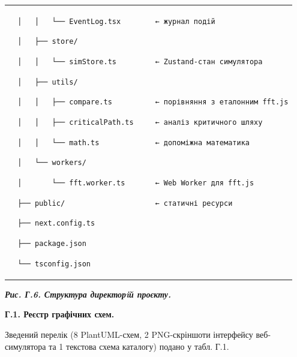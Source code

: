 \documentclass[
]{article}
\newcommand{\passthrough}[1]{#1}
\begin{document}
{\begin{longtable}[]{@{}
  >{\raggedright\arraybackslash}p{}@{}}
\passthrough{\lstinline!  │   │   └── !}\passthrough{\lstinline!EventLog.tsx!}\passthrough{\lstinline!        ← !}\passthrough{\lstinline!журнал!}\passthrough{\lstinline! подій!}

\passthrough{\lstinline!  │   ├── store/!}

\passthrough{\lstinline!  │   │   └── !}\passthrough{\lstinline!simStore.ts!}\passthrough{\lstinline!         ← !}\passthrough{\lstinline!Zustand-стан!}\passthrough{\lstinline! !}\passthrough{\lstinline!симулятора!}

\passthrough{\lstinline!  │   ├── utils/!}

\passthrough{\lstinline!  │   │   ├── !}\passthrough{\lstinline!compare.ts!}\passthrough{\lstinline!          ← !}\passthrough{\lstinline!порівняння!}\passthrough{\lstinline! з !}\passthrough{\lstinline!еталонним!}\passthrough{\lstinline! fft.js!}

\passthrough{\lstinline!  │   │   ├── !}\passthrough{\lstinline!criticalPath.ts!}\passthrough{\lstinline!     ← аналіз !}\passthrough{\lstinline!критичного!}\passthrough{\lstinline! !}\passthrough{\lstinline!шляху!}

\passthrough{\lstinline!  │   │   └── !}\passthrough{\lstinline!math.ts!}\passthrough{\lstinline!             ← !}\passthrough{\lstinline!допоміжна!}\passthrough{\lstinline! !}\passthrough{\lstinline!математика!}

\passthrough{\lstinline!  │   └── workers/!}

\passthrough{\lstinline!  │       └── !}\passthrough{\lstinline!fft.worker.ts!}\passthrough{\lstinline!       ← Web Worker для fft.js!}

\passthrough{\lstinline!  ├── public/                     ← !}\passthrough{\lstinline!статичні!}\passthrough{\lstinline! ресурси!}

\passthrough{\lstinline!  ├── !}\passthrough{\lstinline!next.config.ts!}

\passthrough{\lstinline!  ├── !}\passthrough{\lstinline!package.json!}

\passthrough{\lstinline!  └── !}\passthrough{\lstinline!tsconfig.json!} \\
\end{longtable}
}

\textbf{\emph{Рис. Г.6. Структура директорiй проєкту.}\\
}

\textbf{Г.1. Реєстр графічних схем.}

Зведений перелік (8 PlantUML-схем, 2 PNG-скріншоти інтерфейсу
веб-симулятора та 1 текстова схема каталогу) подано у табл. Г.1.
\end{document}

